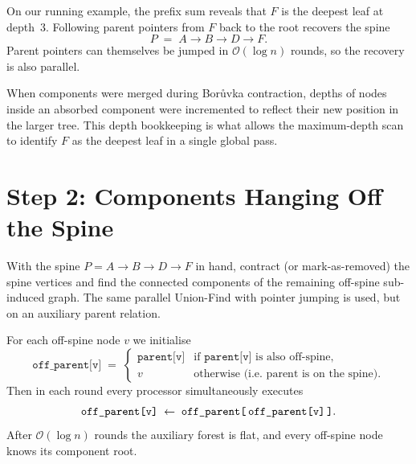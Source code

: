 \begin{ppexample}
On our running example, the prefix sum reveals that $F$ is the deepest
leaf at depth~3.  Following parent pointers from $F$ back to the root
recovers the spine
\[
  P \;=\; A \to B \to D \to F.
\]
Parent pointers can themselves be jumped in $\mathcal{O}(\log n)$ rounds, so
the recovery is also parallel.
\end{ppexample}


\begin{ppnote}
When components were merged during Bor{\r u}vka contraction, depths of
nodes inside an absorbed component were incremented to reflect their
new position in the larger tree.
This depth bookkeeping is what allows the maximum-depth scan to identify
$F$ as the deepest leaf in a single global pass.
\end{ppnote}

\section{Step 2: Components Hanging Off the Spine}

With the spine $P = A \to B \to D \to F$ in hand, contract (or
mark-as-removed) the spine vertices and find the connected components
of the remaining off-spine sub-induced graph.
The same parallel Union-Find with pointer jumping is used, but on an
auxiliary parent relation.

For each off-spine node $v$ we initialise
\[
  \texttt{off\_parent[v]} \;=\;
  \begin{cases}
    \texttt{parent[v]} & \text{if } \texttt{parent[v]} \text{ is also off-spine},\\
    v                  & \text{otherwise (i.e.\ parent is on the spine)}.
  \end{cases}
\]
Then in each round every processor simultaneously executes
\[
  \texttt{off\_parent[v]} \;\leftarrow\;
    \texttt{off\_parent[\,off\_parent[v]\,]}.
\]
After $\mathcal{O}(\log n)$ rounds the auxiliary forest is flat, and every
off-spine node knows its component root.

